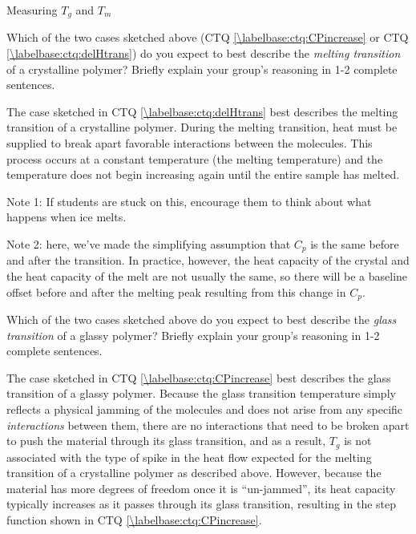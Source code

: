 \begin{activity}{Measuring $T_g$ and $T_m$}
\begin{ctqs}
	\question Which of the two cases sketched above (CTQ \ref{\labelbase:ctq:CPincrease} or CTQ \ref{\labelbase:ctq:delHtrans}) do you expect to best describe the \emph{melting transition} of a crystalline polymer?  Briefly explain your group's reasoning in 1-2 complete sentences.
	
		\begin{solution}[2in]{}
			The case sketched in CTQ \ref{\labelbase:ctq:delHtrans} best describes the melting transition of a crystalline polymer.  During the melting transition, heat must be supplied to break apart favorable interactions between the molecules.  This process occurs at a constant temperature (the melting temperature) and the temperature does not begin increasing again until the entire sample has melted.
			
			Note 1: If students are stuck on this, encourage them to think about what happens when ice melts.
			
			Note 2: here, we've made the simplifying assumption that $C_p$ is the same before and after the transition.  In practice, however, the heat capacity of the crystal and the heat capacity of the melt are not usually the same, so there will be a baseline offset before and after the melting peak resulting from this change in $C_p$.
		\end{solution}
	
	\question Which of the two cases sketched above do you expect to best describe the \emph{glass transition} of a glassy polymer?  Briefly explain your group's reasoning in 1-2 complete sentences.
	
		\begin{solution}[2in]{}
			The case sketched in CTQ \ref{\labelbase:ctq:CPincrease} best describes the glass transition of a glassy polymer. Because the glass transition temperature simply reflects a physical jamming of the molecules and does not arise from any specific \emph{interactions} between them, there are no interactions that need to be broken apart to push the material through its glass transition, and as a result, $T_g$ is not associated with the type of spike in the heat flow expected for the melting transition of a crystalline polymer as described above.  However, because the material has more degrees of freedom once it is ``un-jammed'', its heat capacity typically increases as it passes through its glass transition, resulting in the step function shown in CTQ \ref{\labelbase:ctq:CPincrease}.
		\end{solution}
	

\end{ctqs}
\end{activity}
